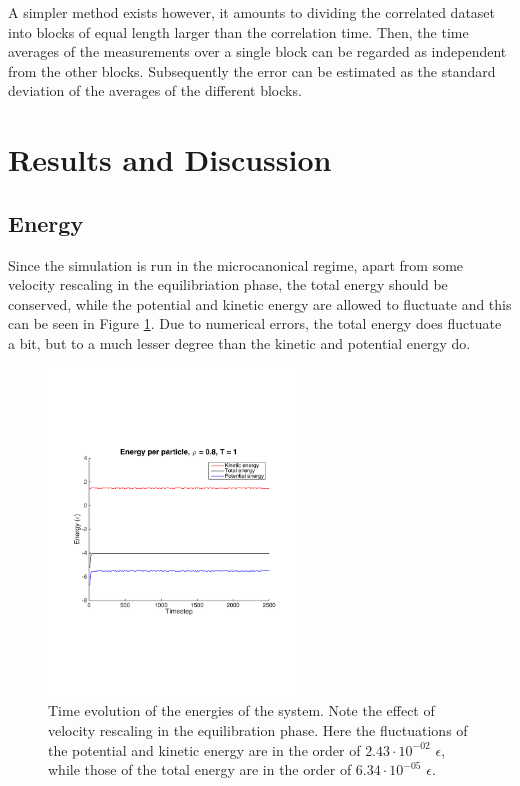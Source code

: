 \documentclass[
10pt, %
a4paper, %
oneside, %
headinclude,footinclude, %
BCOR5mm, %
]{scrartcl}
\begin{document}
A simpler method exists however, it amounts to dividing the correlated dataset into blocks of equal length larger than the correlation time. Then, the time averages of the measurements over a single block can be regarded as independent from the other blocks. Subsequently the error can be estimated as the standard deviation of the averages of the different blocks. 

\newpage

\section{Results and Discussion}



\subsection{Energy}
Since the simulation is run in the microcanonical regime, apart from some velocity rescaling in the equilibriation phase, the total energy should be conserved, while the potential and kinetic energy are allowed to fluctuate and this can be seen in Figure \ref{fig:energy-evolution}. Due to numerical errors, the total energy does fluctuate a bit, but to a much lesser degree than the kinetic and potential energy do. 

\begin{figure}[h]
\centering
\includegraphics[width=0.6\textwidth]{energy-evolution-rho08-T10.pdf}
\caption{Time evolution of the energies of the system. Note the effect of velocity rescaling in the equilibration phase. Here the fluctuations of the potential and kinetic energy are in the order of $2.43\cdot10^{-02}$ $\epsilon$, while those of the total energy are in the order of $6.34\cdot10^{-05}$  $\epsilon$.}
\label{fig:energy-evolution}
\end{figure}
\end{document}
